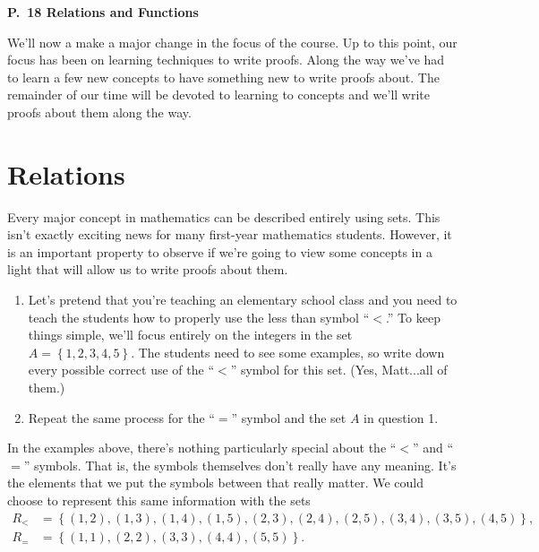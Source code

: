 \documentclass[12 pt]{article}
\newcommand{\set}[1]{\left\{#1\right\}}
\newcommand{\ds}{\displaystyle}
\theoremstyle{definition}
\theoremstyle{plain}
\theoremstyle{mytheorem}
\theoremstyle{myexample}
\theoremstyle{mydefinition}
\begin{document}
\begin{center}
\textbf{P.~18 Relations and Functions}
\end{center}

We'll now a make a major change in the focus of the course.  Up to this point, our focus has been on learning techniques to write proofs.  Along the way we've had to learn a few new concepts to have something new to write proofs about.  The remainder of our time will be devoted to learning to concepts and we'll write proofs about them along the way.

\begin{center}
\end{center}

\section{Relations}

Every major concept in mathematics can be described entirely using sets.  This isn't exactly exciting news for many first-year mathematics students.  However, it is an important property to observe if we're going to view some concepts in a light that will allow us to write proofs about them.

\begin{enumerate}
\item Let's pretend that you're teaching an elementary school class and you need to teach the students how to properly use the less than symbol ``$<$.''  To keep things simple, we'll focus entirely on the integers in the set $\ds A = \set{1,2,3,4,5}.$  The students need to see some examples, so write down every possible correct use of the ``$<$'' symbol for this set.  (Yes, Matt...all of them.)

\vspace{2.5in}

\item Repeat the same process for the ``$=$'' symbol and the set $A$ in question 1.

\end{enumerate}

In the examples above, there's nothing particularly special about the ``$<$'' and ``$=$'' symbols.  That is, the symbols themselves don't really have any meaning.  It's the elements that we put the symbols between that really matter.  We could choose to represent this same information with the sets
\begin{align*}
R_< &=\set{(1,2),(1,3),(1,4),(1,5),(2,3),(2,4),(2,5),(3,4),(3,5),(4,5)},\\
R_= &= \set{(1,1),(2,2),(3,3),(4,4),(5,5)}.
\end{align*}
\end{document}
